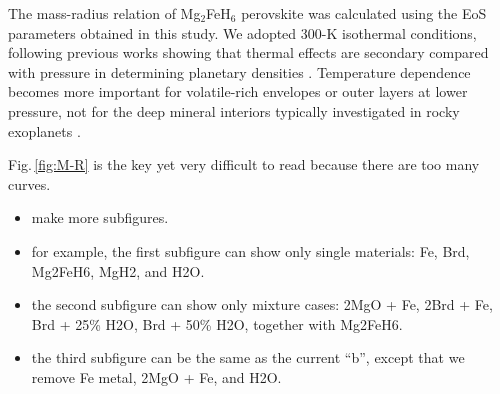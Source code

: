 \documentclass[draft,jgrga,12pt]{agujournal2019}
\begin{document}
The mass-radius relation of Mg$_2$FeH$_6$ perovskite was calculated using the EoS parameters obtained in this study. 
We adopted 300-K isothermal conditions, following previous works showing that thermal effects are secondary compared with pressure in determining planetary densities \cite{valencia_internal_2006, valencia_radius_2007, zeng_detailed_2013, zeng_growth_2019}.
Temperature dependence becomes more important for volatile-rich envelopes or outer layers at lower pressure, not for the deep mineral interiors typically investigated in rocky exoplanets \cite{zeng_new_2021, zeng_detailed_2013}.

\begin{cboxr}
Fig.\,\ref{fig:M-R} is the key yet very difficult to read because there are too many curves.
\begin{itemize}
    \item make more subfigures.
    \item for example, the first subfigure can show only single materials: Fe, Brd, Mg2FeH6, MgH2, and H2O.
    \item the second subfigure can show only mixture cases: 2MgO + Fe, 2Brd + Fe, Brd + 25\% H2O, Brd + 50\% H2O, together with Mg2FeH6.
    \item the third subfigure can be the same as the current ``b'', except that we remove Fe metal, 2MgO + Fe, and H2O.
\end{itemize}

\XWrevised[]
\end{cboxr}
\end{document}
